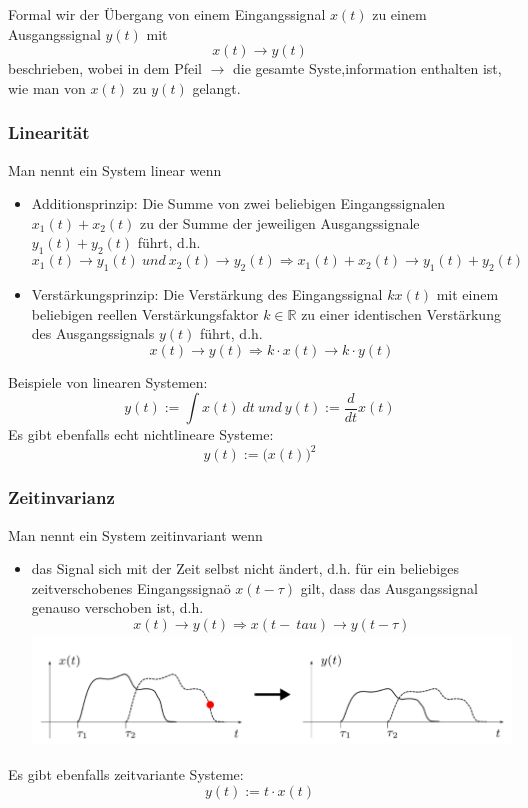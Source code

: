 \documentclass[12pt,a4paper]{scrartcl}
\begin{document}
   \noindent Formal wir der Übergang von einem Eingangssignal $x(t)$ zu einem Ausgangssignal $y(t)$ mit $$ x(t) \to y(t)$$ beschrieben, wobei in dem Pfeil $\to$ die gesamte Syste,information enthalten ist, wie man von $x(t)$ zu $y(t)$ gelangt. \\

   \subsubsection{Linearität}
   \label{sec:sub:sub:linearitaet}
    Man nennt ein System linear wenn
    \begin{itemize}
      \item Additionsprinzip: Die Summe von zwei beliebigen Eingangssignalen $x_1(t) + x_2(t)$ zu der Summe der jeweiligen Ausgangssignale $y_1(t) + y_2(t)$ führt, d.h. 
            $$x_1(t) \to y_1(t)\ und\ x_2(t)\to y_2(t) \Rightarrow x_1(t) + x_2(t) \to y_1(t) + y_2(t)$$ 
      \item Verstärkungsprinzip: Die Verstärkung des Eingangssignal $kx(t)$ mit einem beliebigen reellen Verstärkungsfaktor $ k \in \mathbb{R}$ zu einer identischen Verstärkung des Ausgangssignals $y(t)$ führt, d.h.
          $$ x(t) \to y(t) \Rightarrow k\cdot x(t) \to k\cdot y(t)$$ 
    \end{itemize}
\noindent Beispiele von linearen Systemen: $$ y(t) := \int x(t)\ dt \ und \ y(t) := \frac{d}{dt}x(t)$$
\noindent Es gibt ebenfalls echt nichtlineare Systeme: $$y(t) := \big(x(t)\big)^2$$


    \subsubsection{Zeitinvarianz}
    \label{sec:sub:sub:zeitinvarianz}
    Man nennt ein System zeitinvariant wenn 
    \begin{itemize}
      \item das Signal sich mit der Zeit selbst nicht ändert, d.h. für ein beliebiges zeitverschobenes Eingangssignaö $x(t-\tau)$ gilt, dass das Ausgangssignal genauso verschoben ist, d.h. 
        $$ x(t) \to y(t) \Rightarrow x(t-\ tau) \to y(t - \tau)$$
        \includegraphics[height=3cm]{Pictures/Zeitinvarianz.png}
    \end{itemize}
    \noindent Es gibt ebenfalls zeitvariante Systeme: $$y(t) := t\cdot x(t)$$
\end{document}
